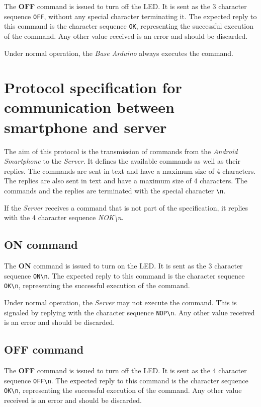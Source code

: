 \documentclass[conference, a4paper]{IEEEtran}
\begin{document}
The \textbf{OFF} command is issued to turn off the LED. It is sent as the 3 character sequence \texttt{OFF}, without any special character terminating it. The expected reply to this command is the character sequence \texttt{OK}, representing the successful execution of the command. Any other value received is an error and should be discarded.

Under normal operation, the \textit{Base Arduino} always executes the command.

\section{Protocol specification for communication between smartphone and server}
\label{prot_smart}

The aim of this protocol is the transmission of commands from the \textit{Android Smartphone} to the \textit{Server}. It defines the available commands as well as their replies. The commands are sent in text and have a maximum size of 4 characters. The replies are also sent in text and have a maximum size of 4 characters. The commands and the replies are terminated with the special character \texttt{\textbackslash n}.

If the \textit{Server} receives a command that is not part of the specification, it replies with the 4 character sequence \textit{NOK\textbackslash n}.

\subsection{ON command}

The \textbf{ON} command is issued to turn on the LED. It is sent as the 3 character sequence \texttt{ON\textbackslash n}. The expected reply to this command is the character sequence \texttt{OK\textbackslash n}, representing the successful execution of the command.

Under normal operation, the \textit{Server} may not execute the command. This is signaled by replying with the character sequence \texttt{NOP\textbackslash n}. Any other value received is an error and should be discarded.

\subsection{OFF command}

The \textbf{OFF} command is issued to turn off the LED. It is sent as the 4 character sequence \texttt{OFF\textbackslash n}. The expected reply to this command is the character sequence \texttt{OK\textbackslash n}, representing the successful execution of the command. Any other value received is an error and should be discarded.
\end{document}
